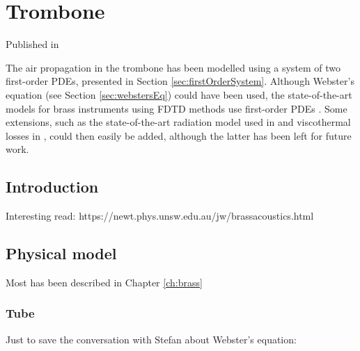 \chapter{Trombone}\label{ch:trombone}
Published in \citeP[H]

The air propagation in the trombone has been modelled using a system of two first-order PDEs, presented in Section \ref{sec:firstOrderSystem}. Although Webster's equation (see Section \ref{sec:webstersEq}) could have been used, the state-of-the-art models for brass instruments using FDTD methods use first-order PDEs \cite{Bilbao2016, Harrison2018}. Some extensions, such as the state-of-the-art radiation model used in \cite{Harrison2018} and viscothermal losses in \cite{Bilbao2016}, could then easily be added, although the latter has been left for future work.  


\section{Introduction}
Interesting read: https://newt.phys.unsw.edu.au/jw/brassacoustics.html
\section{Physical model}
Most has been described in Chapter \ref{ch:brass}

\subsection{Tube}
Just to save the conversation with Stefan about Webster's equation:

